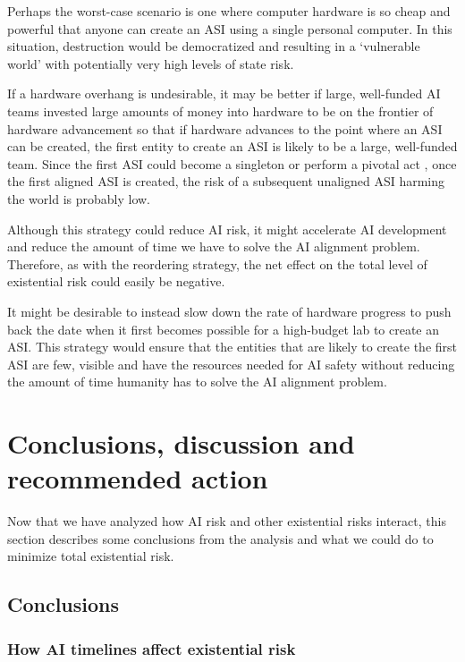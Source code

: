 \documentclass{article}
\begin{document}
Perhaps the worst-case scenario is one where computer hardware is so cheap and powerful that anyone can create an ASI using a single personal computer. In this situation, destruction would be democratized and resulting in a ‘vulnerable world’ \cite{vulnerable} with potentially very high levels of state risk.

If a hardware overhang is undesirable, it may be better if large, well-funded AI teams invested large amounts of money into hardware to be on the frontier of hardware advancement so that if hardware advances to the point where an ASI can be created, the first entity to create an ASI is likely to be a large, well-funded team. Since the first ASI could become a singleton \cite{superintelligence} or perform a pivotal act \cite{pivotal}, once the first aligned ASI is created, the risk of a subsequent unaligned ASI harming the world is probably low.

Although this strategy could reduce AI risk, it might accelerate AI development and reduce the amount of time we have to solve the AI alignment problem. Therefore, as with the reordering strategy, the net effect on the total level of existential risk could easily be negative.

It might be desirable to instead slow down the rate of hardware progress to push back the date when it first becomes possible for a high-budget lab to create an ASI. This strategy would ensure that the entities that are likely to create the first ASI are few, visible and have the resources needed for AI safety without reducing the amount of time humanity has to solve the AI alignment problem.

\section{Conclusions, discussion and recommended action}

Now that we have analyzed how AI risk and other existential risks interact, this section describes some conclusions from the analysis and what we could do to minimize total existential risk.

\subsection{Conclusions}

\subsubsection{How AI timelines affect existential risk}
\end{document}

